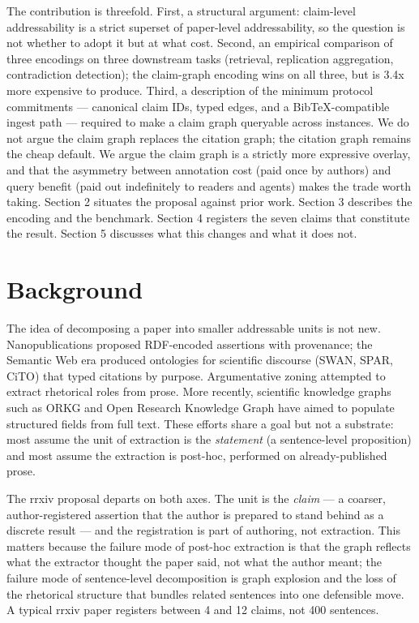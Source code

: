 \documentclass{rrxiv}
\begin{document}
The contribution is threefold. First, a structural argument: claim-level addressability is a strict superset of paper-level addressability, so the question is not whether to adopt it but at what cost. Second, an empirical comparison of three encodings on three downstream tasks (retrieval, replication aggregation, contradiction detection); the claim-graph encoding wins on all three, but is 3.4x more expensive to produce. Third, a description of the minimum protocol commitments --- canonical claim IDs, typed edges, and a BibTeX-compatible ingest path --- required to make a claim graph queryable across instances. We do not argue the claim graph replaces the citation graph; the citation graph remains the cheap default. We argue the claim graph is a strictly more expressive overlay, and that the asymmetry between annotation cost (paid once by authors) and query benefit (paid out indefinitely to readers and agents) makes the trade worth taking. Section 2 situates the proposal against prior work. Section 3 describes the encoding and the benchmark. Section 4 registers the seven claims that constitute the result. Section 5 discusses what this changes and what it does not.

\section{Background}

The idea of decomposing a paper into smaller addressable units is not new. Nanopublications \citep{groth2010nano} proposed RDF-encoded assertions with provenance; the Semantic Web era produced ontologies for scientific discourse (SWAN, SPAR, CiTO) that typed citations by purpose. Argumentative zoning \citep{teufel2009towards} attempted to extract rhetorical roles from prose. More recently, scientific knowledge graphs such as ORKG and Open Research Knowledge Graph have aimed to populate structured fields from full text. These efforts share a goal but not a substrate: most assume the unit of extraction is the \emph{statement} (a sentence-level proposition) and most assume the extraction is post-hoc, performed on already-published prose.

The rrxiv proposal departs on both axes. The unit is the \emph{claim} --- a coarser, author-registered assertion that the author is prepared to stand behind as a discrete result --- and the registration is part of authoring, not extraction. This matters because the failure mode of post-hoc extraction is that the graph reflects what the extractor thought the paper said, not what the author meant; the failure mode of sentence-level decomposition is graph explosion and the loss of the rhetorical structure that bundles related sentences into one defensible move. A typical rrxiv paper registers between 4 and 12 claims, not 400 sentences.
\end{document}
